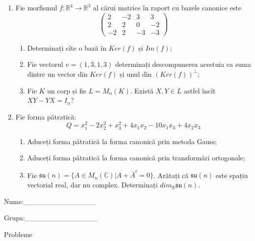 \documentclass{article}
\begin{document}
\begin{enumerate}
 \item Fie morfismul $f:\mathbb{R}^4 \to \mathbb{R}^3$ al cărui matrice în raport cu bazele canonice este
$$\begin{pmatrix}
2&-2&3&3\\
2&2&0&-2\\
-2&2&-3&-3
\end{pmatrix}$$

\begin{enumerate}
\item Determinați cîte o bază în $Ker(f)$ și $Im(f)$;
\item Fie vectorul $v=(1,3,1,3)$ determinați descompunerea acestuia ca suma dintre un vector din $Ker(f)$ și unul din $(Ker(f))^\perp$;
\item Fie $K$ un corp și fie $L=M_n(K)$. Există $X,Y \in L$ astfel încît $XY-YX=I_n$?  
\end{enumerate}
\item Fie forma pătratică:
$$Q= x_1^2-2x_2^2+x_3^2+4x_1x_2-10x_1x_3+4x_2x_3$$

\begin{enumerate}
\item Aduceți forma pătratică la forma canonică prin metoda Gauss;
\item Aduceți forma pătratică la forma canonică prin transformări ortogonale;
\item Fie $\mathfrak{su}(n)=\{ A \in M_n(\mathbb{C}) | A+\bar{A}^t=0\}$. Arătați că $\mathfrak{su}(n)$ este spațiu vectorial real, dar nu complex.
Determinați $dim_{\mathbb{R}}\mathfrak{su}(n)$.
\end{enumerate}
\end{enumerate}
\newpage
\begin{flushright}
Nume:\_\_\_\_\_\_\_\_\_\_\_\_\_\_
 
 
Grupa:\_\_\_\_\_\_\_\_\_\_\_\_\_\_
\end{flushright}
\begin{center}
\vspace{2cm}
{\Large Probleme}
\vspace{2cm}
\end{center}
\end{document}
